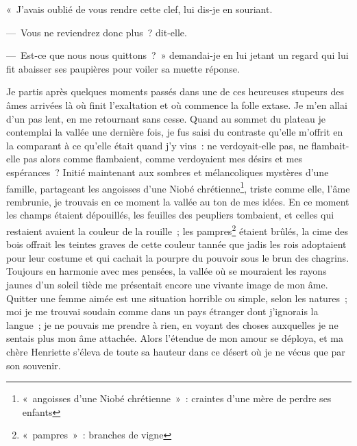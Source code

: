 
	{

«~J'avais oublié de vous rendre cette clef, lui dis-je en souriant.

—~Vous ne reviendrez donc plus~? dit-elle.

—~Est-ce que nous nous quittons~?~» demandai-je en lui jetant un
regard qui lui fit abaisser ses paupières pour voiler sa muette
réponse.

Je partis après quelques moments passés dans une de ces heureuses
stupeurs des âmes arrivées là où finit l'exaltation et où commence la
folle extase. Je m'en allai d'un pas lent, en me retournant sans
cesse. Quand au sommet du plateau je contemplai la vallée une
dernière fois, je fus saisi du contraste qu'elle m'offrit en la
comparant à ce qu'elle était quand j'y vins~: ne verdoyait-elle pas,
ne flambait-elle pas alors comme flambaient, comme verdoyaient mes
désirs et mes espérances~? Initié maintenant aux sombres et
mélancoliques mystères d'une famille, partageant les angoisses d'une
Niobé chrétienne\footnote{«~angoisses d'une Niobé chrétienne~»~: craintes d'une mère de perdre ses enfants}, triste comme elle, l'âme rembrunie, je trouvais
en ce moment la vallée au ton de mes idées. En ce moment les champs
étaient dépouillés, les feuilles des peupliers tombaient, et celles
qui restaient avaient la couleur de la rouille~; les pampres\footnote{«~pampres~»~: branches de vigne}
étaient brûlés, la cime des bois offrait les teintes graves de cette
couleur tannée que jadis les rois adoptaient pour leur costume et qui
cachait la pourpre du pouvoir sous le brun des chagrins. Toujours en
harmonie avec mes pensées, la vallée où se mouraient les rayons
jaunes d'un soleil tiède me présentait encore une vivante image de
mon âme. Quitter une femme aimée est une situation horrible ou
simple, selon les natures~; moi je me trouvai soudain comme dans un
pays étranger dont j'ignorais la langue~; je ne pouvais me prendre à
rien, en voyant des choses auxquelles je ne sentais plus mon âme
attachée. Alors l'étendue de mon amour se déploya, et ma chère
Henriette s'éleva de toute sa hauteur dans ce désert où je ne vécus
que par son souvenir.
}

